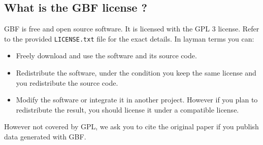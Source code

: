 \documentclass[10pt,a4paper]{article}
\begin{document}
\subsection{What is the GBF license ?}
\label{sec-6-10}

GBF is free and open source software. It is licensed with the GPL 3
license. Refer to the provided \texttt{LICENSE.txt} file for the exact
details. In layman terms you can:

\begin{itemize}
\item Freely download and use the software and its source code.
\item Redistribute the software, under the condition you keep the same license and
you redistribute the source code.
\item Modify the software or integrate it in another project. However if
you plan to redistribute the result, you should license it under a
compatible license.
\end{itemize}

However not covered by GPL, we ask you to cite the original paper if
you publish data generated with GBF.
\end{document}
